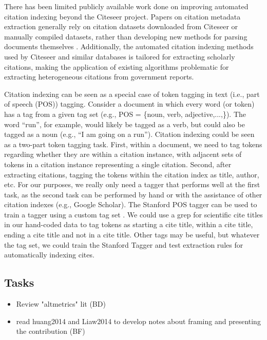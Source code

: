 \documentclass[12pt]{article}
\begin{document}
There has been limited publicly available work done on improving automated citation indexing beyond the Citeseer project. Papers on citation metadata extraction generally rely on citation datasets downloaded from Citeseer or manually compiled datasets, rather than developing new methods for parsing documents themselves \cite{anzaroot2013}. Additionally, the automated citation indexing methods used by Citeseer and similar databases is tailored for extracting scholarly citations, making the application of existing algorithms problematic for extracting heterogeneous citations from government reports.

Citation indexing can be seen as a special case of token tagging in text (i.e., part of speech (POS)) tagging. Consider a document in which every word (or token) has a tag from a given tag set (e.g., POS = \{noun, verb, adjective,...,\}). The word ``run'', for example, would likely be tagged as a verb, but could also be tagged as a noun (e.g., ``I am going on a run''). Citation indexing could be seen as a two-part token tagging task. First, within a document, we need to tag tokens regarding whether they are within a citation instance, with adjacent sets of tokens in a citation instance representing a single citation. Second, after extracting citations, tagging the tokens within the citation index as title, author, etc. For our purposes, we really only need a tagger that performs well at the first task, as the second task can be performed by hand or with the assistance of other citation indexes (e.g., Google Scholar). The Stanford POS tagger can be used to train a tagger using a custom tag set \cite{toutanova2003}. We could use a grep for scientific cite titles in our hand-coded data to tag tokens as starting a cite title, within a cite title, ending a cite title and not in a cite title. Other tags may be useful, but whatever the tag set, we could train the Stanford Tagger and test extraction rules for automatically indexing cites.  


\subsection{Tasks}

\begin{itemize}
\item Review "altmetrics" lit (BD)
\item  read huang2014 and Liaw2014 to develop notes about framing and presenting the contribution (BF)
\end{itemize}
\end{document}
